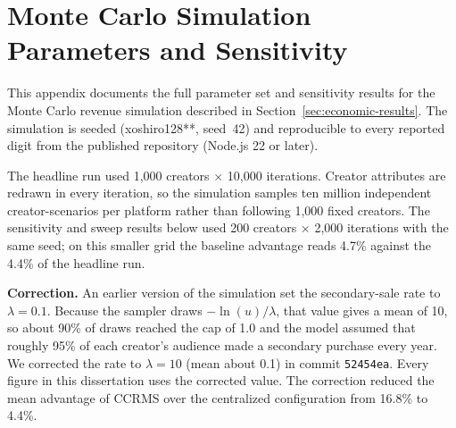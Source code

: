 
\chapter{Monte Carlo Simulation Parameters and Sensitivity}\label{app:monte-carlo}

This appendix documents the full parameter set and sensitivity results for the Monte Carlo revenue simulation described in Section~\ref{sec:economic-results}. The simulation is seeded (xoshiro128**, seed~42) and reproducible to every reported digit from the published repository (Node.js 22 or later).

The headline run used 1,000 creators $\times$ 10,000 iterations. Creator attributes are redrawn in every iteration, so the simulation samples ten million independent creator-scenarios per platform rather than following 1,000 fixed creators. The sensitivity and sweep results below used 200 creators $\times$ 2,000 iterations with the same seed; on this smaller grid the baseline advantage reads 4.7\% against the 4.4\% of the headline run.

\textbf{Correction.} An earlier version of the simulation set the secondary-sale rate to $\lambda = 0.1$. Because the sampler draws $-\ln(u)/\lambda$, that value gives a mean of 10, so about 90\% of draws reached the cap of 1.0 and the model assumed that roughly 95\% of each creator's audience made a secondary purchase every year. We corrected the rate to $\lambda = 10$ (mean about 0.1) in commit \texttt{52454ea}. Every figure in this dissertation uses the corrected value. The correction reduced the mean advantage of CCRMS over the centralized configuration from 16.8\% to 4.4\%.

